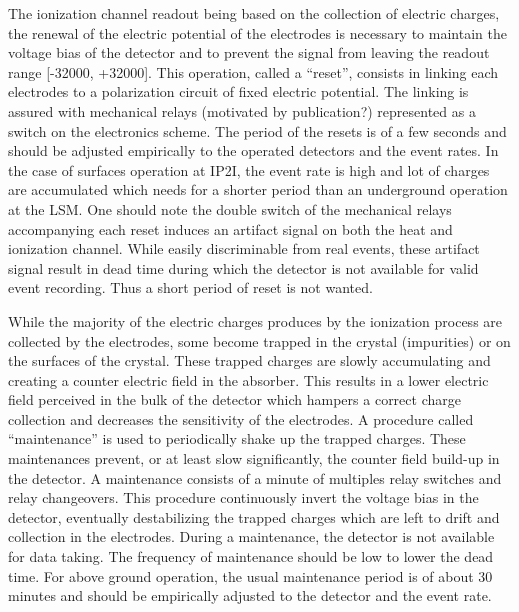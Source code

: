 The ionization channel readout being based on the collection of electric charges, the renewal of the electric potential of the electrodes is necessary to maintain the voltage bias of the detector and to prevent the signal from leaving the readout range [-32000, +32000]. This operation, called a “reset”, consists in linking each electrodes to a polarization circuit of fixed electric potential. The linking is assured with mechanical relays (motivated by publication?) represented as a switch on the electronics scheme. The period of the resets is of a few seconds and should be adjusted empirically to the operated detectors and the event rates. In the case of surfaces operation at IP2I, the event rate is high and lot of charges are accumulated which needs for a shorter period than an underground operation at the LSM.
One should note the double switch of the mechanical relays accompanying each reset induces an artifact signal on both the heat and ionization channel. While easily discriminable from real events, these artifact signal result in dead time during which the detector is not available for valid event recording. Thus a short period of reset is not wanted.

While the majority of the electric charges produces by the ionization process are collected by the electrodes, some become trapped in the crystal (impurities) or on the surfaces of the crystal. These trapped charges are slowly accumulating and creating a counter electric field in the absorber. This results in a lower electric field perceived in the bulk of the detector which hampers a correct charge collection and decreases the sensitivity of the electrodes.
A procedure called “maintenance” is used to periodically shake up the trapped charges. These maintenances prevent, or at least slow significantly, the counter field build-up in the detector. A maintenance consists of a minute of multiples relay switches and relay changeovers. This procedure continuously invert the voltage bias in the detector, eventually destabilizing the trapped charges which are left to drift and collection in the electrodes.
During a maintenance, the detector is not available for data taking. The frequency of maintenance should be low to lower the dead time. For above ground operation, the usual maintenance period is of about 30 minutes and should be empirically adjusted to the detector and the event rate.

